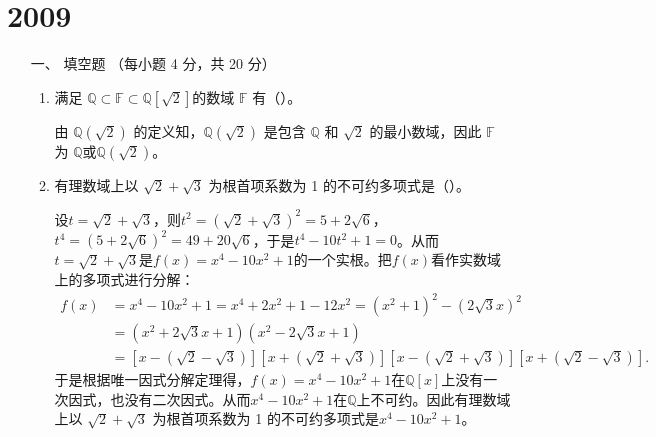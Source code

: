 \section{2009}
\begin{enumerate}[1~]
\renewcommand{\labelenumi}{\textbf{\theenumi. }}
\renewcommand{\Im}{\text{Im }}
\item[一、]
填空题 （每小题 4 分，共 20 分）
\begin{enumerate}[1.~]
\item
满足 $\mathbb{Q} \subset \mathbb{F} \subset \mathbb{Q}[\sqrt{2}]$的数域 $\mathbb{F}$ 有（\quad）。
\begin{solution}
由 $ \mathbb{Q}(\sqrt{2})$ 的定义知，$ \mathbb{Q}(\sqrt{2})$ 是包含 $ \mathbb{Q}$ 和 $\sqrt{2}$ 的最小数域，因此 $\mathbb{F}$ 为 $\mathbb{Q}$或$ \mathbb{Q}(\sqrt{2})$。

\end{solution}

\item
有理数域上以 $\sqrt { 2 } + \sqrt { 3 }$ 为根首项系数为 1 的不可约多项式是（\quad）。
\begin{solution}
设$t=\sqrt{2}+\sqrt{3}$，则$t^2=(\sqrt{2}+\sqrt{3})^2=5+2\sqrt{6}$，$t^4=(5+2\sqrt{6})^2=49+20\sqrt{6}$，于是$t^4-10t^2+1=0$。从而$t=\sqrt{2}+\sqrt{3}$是$f(x)=x^4-10x^2+1$的一个实根。把$f(x)$看作实数域上的多项式进行分解：\begin{align*}
f(x)&=x^4-10x^2+1=x^4+2x^2+1-12x^2=(x^2+1)^2-(2\sqrt{3}x)^2\\
&=(x^2+2\sqrt{3}x+1)(x^2-2\sqrt{3}x+1)\\
&=[x-(\sqrt{2}-\sqrt{3})][x+(\sqrt{2}+\sqrt{3})][x-(\sqrt{2}+\sqrt{3})][x+(\sqrt{2}-\sqrt{3})].
\end{align*}
于是根据唯一因式分解定理得，$f(x)=x^4-10x^2+1$在$\mathbb{Q}[x]$上没有一次因式，也没有二次因式。从而$x^4-10x^2+1$在$\mathbb{Q}$上不可约。因此有理数域上以 $\sqrt { 2 } + \sqrt { 3 }$ 为根首项系数为 1 的不可约多项式是$x^4-10x^2+1$。
\end{solution}


\end{enumerate}
\end{enumerate}
